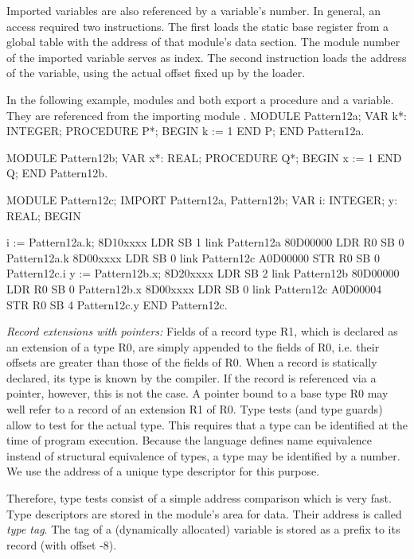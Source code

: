 Imported variables are also referenced by a variable's number. In general, an access required two instructions. The first loads the static base register  from a global table with the address of that module's data section. The module number of the imported variable serves as index. The second instruction loads the address of the variable, using the actual offset fixed up by the loader.

In the following example, modules  and  both export a procedure and a variable. They are referenced from the importing module .
\begintt
MODULE Pattern12a;
  VAR k*: INTEGER;
  PROCEDURE P*;
  BEGIN k := 1
  END P;
END Pattern12a.

MODULE Pattern12b;
  VAR x*: REAL;
  PROCEDURE Q*;
  BEGIN x := 1
  END Q;
END Pattern12b.

MODULE Pattern12c;
  IMPORT Pattern12a, Pattern12b;
  VAR i: INTEGER; y: REAL;
BEGIN

  i := Pattern12a.k;  8D10xxxx   LDR SB 1 link  Pattern12a
                      80D00000   LDR R0 SB 0    Pattern12a.k
                      8D00xxxx   LDR SB 0 link  Pattern12c
                      A0D00000   STR R0 SB 0    Pattern12c.i
  y := Pattern12b.x;  8D20xxxx   LDR SB 2 link  Pattern12b
                      80D00000   LDR R0 SB 0    Pattern12b.x
                      8D00xxxx   LDR SB 0 link  Pattern12c
                      A0D00004   STR R0 SB 4    Pattern12c.y
END Pattern12c.
\endtt

\noindent {} \emph{Record extensions with pointers:} Fields of a record type R1, which is declared as an extension of a type R0, are simply appended to the fields of R0, i.e. their offsets are greater than those of the fields of R0. When a record is statically declared, its type is known by the compiler. If the record is referenced via a pointer, however, this is not the case. A pointer bound to a base type R0 may well refer to a record of an extension R1 of R0. Type tests (and type guards) allow to test for the actual type. This requires that a type can be identified at the time of program execution. Because the language defines name equivalence instead of structural equivalence of types, a type may be identified by a number. We use the address of a unique type descriptor for this purpose.

Therefore, type tests consist of a simple address comparison which is very fast. Type descriptors are stored in the module's area for data. Their address is called \emph{type tag}. The tag of a (dynamically allocated) variable is stored as a prefix to its record (with offset -8).

